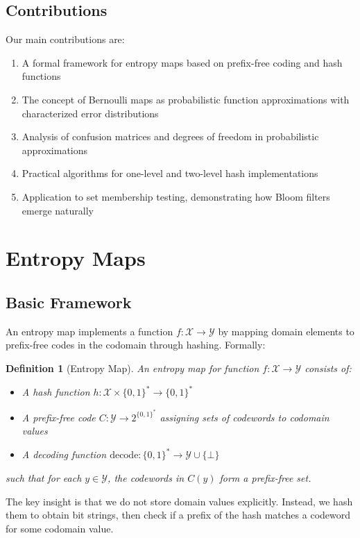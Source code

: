 \documentclass[11pt]{article}
\newtheorem{definition}[theorem]{Definition}
\newcommand{\calX}{\mathcal{X}}
\newcommand{\calY}{\mathcal{Y}}
\begin{document}
\subsection{Contributions}

Our main contributions are:
\begin{enumerate}
\item A formal framework for entropy maps based on prefix-free coding and hash functions
\item The concept of Bernoulli maps as probabilistic function approximations with characterized error distributions
\item Analysis of confusion matrices and degrees of freedom in probabilistic approximations
\item Practical algorithms for one-level and two-level hash implementations
\item Application to set membership testing, demonstrating how Bloom filters emerge naturally
\end{enumerate}

\section{Entropy Maps}

\subsection{Basic Framework}

An entropy map implements a function $f: \calX \to \calY$ by mapping domain elements to prefix-free codes in the codomain through hashing. Formally:

\begin{definition}[Entropy Map]
An entropy map for function $f: \calX \to \calY$ consists of:
\begin{itemize}
\item A hash function $h: \calX \times \{0,1\}^* \to \{0,1\}^*$
\item A prefix-free code $C: \calY \to 2^{\{0,1\}^*}$ assigning sets of codewords to codomain values
\item A decoding function $\text{decode}: \{0,1\}^* \to \calY \cup \{\bot\}$
\end{itemize}
such that for each $y \in \calY$, the codewords in $C(y)$ form a prefix-free set.
\end{definition}

The key insight is that we do not store domain values explicitly. Instead, we hash them to obtain bit strings, then check if a prefix of the hash matches a codeword for some codomain value.
\end{document}
